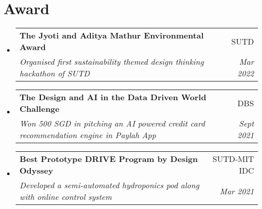 \documentclass[letterpaper,11pt]{article}
\makeatletter
\newcommand{\resumeSubheading}[4]{
  \vspace{-2pt}\item
    \begin{tabular*}{0.97\textwidth}[t]{l@{\extracolsep{\fill}}r}
      \textbf{#1} & #2 \\
      \textit{\small#3} & \textit{\small #4} \\
    \end{tabular*}\vspace{-7pt}
}
\newcommand{\resumeSubHeadingListStart}{\begin{itemize}[leftmargin=0.15in, label={}]}
\newcommand{\resumeSubHeadingListEnd}{\end{itemize}}
\makeatother
\begin{document}
\section{Award}
 \resumeSubHeadingListStart
    \resumeSubheading
      {The Jyoti and Aditya Mathur Environmental Award}{SUTD}
      {Organised first sustainability themed design thinking hackathon of SUTD}{Mar 2022}
    \resumeSubheading
      {The Design and AI in the Data Driven World  Challenge}{DBS}
      {Won 500 SGD in pitching an AI powered credit card recommendation engine in Paylah App}{Sept 2021}
    \resumeSubheading
      {Best Prototype DRIVE Program by Design Odyssey}{SUTD-MIT IDC}
      {Developed a semi-automated hydroponics pod along with online control system}{Mar 2021}
  \resumeSubHeadingListEnd


\end{document}
